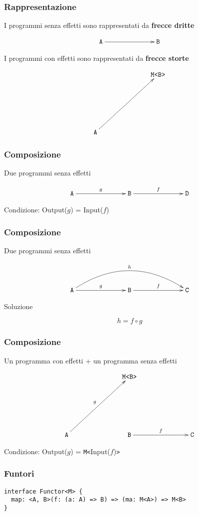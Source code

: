 \documentclass{beamer}
\begin{document}
\begin{frame}
\frametitle{Rappresentazione}

I programmi senza effetti sono rappresentati da \textbf{frecce dritte}

\[
\xymatrixrowsep{2.5cm}
\xymatrixcolsep{2.5cm}
\xymatrix{
  \texttt{A} \ar[r] & \texttt{B}
}
\]

I programmi con effetti sono rappresentati da \textbf{frecce storte}

\[
\xymatrixrowsep{2.5cm}
\xymatrixcolsep{2.5cm}
\xymatrix{
  & \texttt{M<B>} \\
  \texttt{A} \ar[ur]
}
\]

\end{frame}

\begin{frame}
\frametitle{Composizione}

Due programmi senza effetti

\[
\xymatrixrowsep{2.5cm}
\xymatrixcolsep{2.5cm}
\xymatrix{
  \texttt{A} \ar[r]^{g} & \texttt{B} \ar[r]^{f} & \texttt{D}
}
\]

Condizione: Output($g$) = Input($f$)

\end{frame}

\begin{frame}
\frametitle{Composizione}

Due programmi senza effetti

\[
\xymatrixrowsep{2.5cm}
\xymatrixcolsep{2.5cm}
\xymatrix{
  \texttt{A} \ar[r]^{g} \ar@/^1cm/[rr]^{h} & \texttt{B} \ar[r]^{f} & \texttt{C}
}
\]

Soluzione

$$
h = f \circ g
$$

\end{frame}

\begin{frame}
\frametitle{Composizione}

Un programma con effetti + un programma senza effetti

\[
\xymatrixrowsep{2.5cm}
\xymatrixcolsep{2.5cm}
\xymatrix{
  & \texttt{M<B>} \\
  \texttt{A} \ar[ur]^{g} & \texttt{B} \ar[r]^{f} & \texttt{C}
}
\]

Condizione: Output($g$) = \texttt{M<}Input($f$)\texttt{>}

\end{frame}

\begin{frame}[fragile]
\frametitle{Funtori}

\begin{verbatim}
interface Functor<M> {
  map: <A, B>(f: (a: A) => B) => (ma: M<A>) => M<B>
}
\end{verbatim}

\end{frame}
\end{document}
